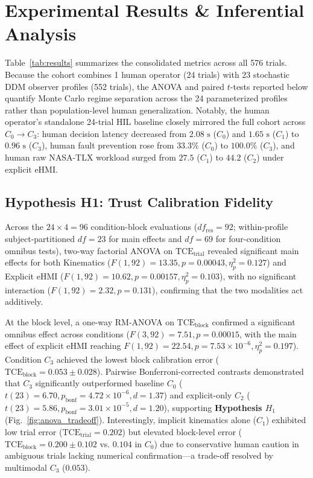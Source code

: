 \documentclass[conference]{IEEEtran}
\begin{document}
\section{Experimental Results \& Inferential Analysis}

Table~\ref{tab:results} summarizes the consolidated metrics across all 576 trials. Because the cohort combines 1 human operator (24 trials) with 23 stochastic DDM observer profiles (552 trials), the ANOVA and paired $t$-tests reported below quantify Monte Carlo regime separation across the 24 parameterized profiles rather than population-level human generalization. Notably, the human operator's standalone 24-trial HIL baseline closely mirrored the full cohort across $C_0 \rightarrow C_3$: human decision latency decreased from $2.08\text{ s}$ ($C_0$) and $1.65\text{ s}$ ($C_1$) to $0.96\text{ s}$ ($C_3$), human fault prevention rose from $33.3\%$ ($C_0$) to $100.0\%$ ($C_3$), and human raw NASA-TLX workload surged from $27.5$ ($C_1$) to $44.2$ ($C_2$) under explicit eHMI.

\subsection{Hypothesis H1: Trust Calibration Fidelity}
Across the $24 \times 4 = 96$ condition-block evaluations ($df_{\text{res}} = 92$; within-profile subject-partitioned $df = 23$ for main effects and $df = 69$ for four-condition omnibus tests), two-way factorial ANOVA on $\text{TCE}_{\text{trial}}$ revealed significant main effects for both Kinematics ($F(1, 92) = 13.35, p = 0.00043, \eta_p^2 = 0.127$) and Explicit eHMI ($F(1, 92) = 10.62, p = 0.00157, \eta_p^2 = 0.103$), with no significant interaction ($F(1, 92) = 2.32, p = 0.131$), confirming that the two modalities act additively.

At the block level, a one-way RM-ANOVA on $\text{TCE}_{\text{block}}$ confirmed a significant omnibus effect across conditions ($F(3, 92) = 7.51, p = 0.00015$, with the main effect of explicit eHMI reaching $F(1, 92) = 22.54, p = 7.53 \times 10^{-6}, \eta_p^2 = 0.197$). Condition $C_3$ achieved the lowest block calibration error ($\text{TCE}_{\text{block}} = 0.053 \pm 0.028$). Pairwise Bonferroni-corrected contrasts demonstrated that $C_3$ significantly outperformed baseline $C_0$ ($t(23) = 6.70, p_{\text{bonf}} = 4.72 \times 10^{-6}, d = 1.37$) and explicit-only $C_2$ ($t(23) = 5.86, p_{\text{bonf}} = 3.01 \times 10^{-5}, d = 1.20$), supporting \textbf{Hypothesis $H_1$} (Fig.~\ref{fig:anova_tradeoff}). Interestingly, implicit kinematics alone ($C_1$) exhibited low trial error ($\text{TCE}_{\text{trial}} = 0.202$) but elevated block-level error ($\text{TCE}_{\text{block}} = 0.200 \pm 0.102$ vs. $0.104$ in $C_0$) due to conservative human caution in ambiguous trials lacking numerical confirmation—a trade-off resolved by multimodal $C_3$ ($0.053$).
\end{document}
